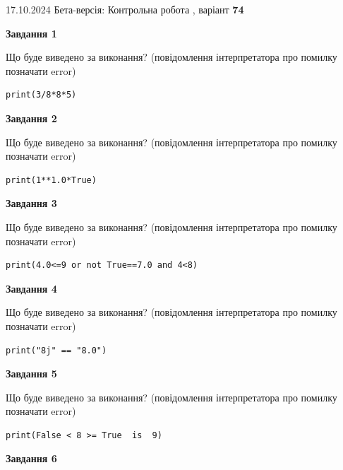 \documentclass[12pt, ukrainian]{article}
\begin{document}
{\Large{17.10.2024 Бета-версія: Контрольна робота , варіант  \No \textbf { 74 }\par}}
{
\begin {large}
{\begin {center}\textbf{Завдання 1}\end {center}}

Що буде виведено за виконання? (повідомлення інтерпретатора про помилку позначати error)\par
\begin{verbatim}
print(3/8*8*5)
\end{verbatim}

{\begin {center}\textbf{Завдання 2}\end {center}}

Що буде виведено за виконання? (повідомлення інтерпретатора про помилку позначати error)\par
\begin{verbatim}
print(1**1.0*True)
\end{verbatim}

{\begin {center}\textbf{Завдання 3}\end {center}}

Що буде виведено за виконання? (повідомлення інтерпретатора про помилку позначати error)\par
\begin{verbatim}
print(4.0<=9 or not True==7.0 and 4<8)
\end{verbatim}

{\begin {center}\textbf{Завдання 4}\end {center}}

Що буде виведено за виконання? (повідомлення інтерпретатора про помилку позначати error)\par
\begin{verbatim}
print("8j" == "8.0")
\end{verbatim}

{\begin {center}\textbf{Завдання 5}\end {center}}

Що буде виведено за виконання? (повідомлення інтерпретатора про помилку позначати error)\par
\begin{verbatim}
print(False < 8 >= True  is  9)
\end{verbatim}

{\begin {center}\textbf{Завдання 6}\end {center}}


\end{large}}
\end{document}
